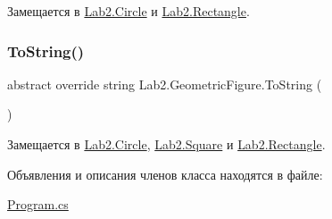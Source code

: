 Замещается в \hyperlink{class_lab2_1_1_circle_afe38ef7cc9ce4b02a6e640d3029e5962}{Lab2.\+Circle} и \hyperlink{class_lab2_1_1_rectangle_a3a44a2229aaec3be07a35eb6a167b100}{Lab2.\+Rectangle}.

\mbox{\label{class_lab2_1_1_geometric_figure_a2f466edc438f43540ead2bc66925ef0a}} 
\subsubsection{\texorpdfstring{To\+String()}{ToString()}}
{\footnotesize\ttfamily abstract override string Lab2.\+Geometric\+Figure.\+To\+String (\begin{DoxyParamCaption}{ }\end{DoxyParamCaption})\hspace{0.3cm}{\ttfamily [pure virtual]}}



Замещается в \hyperlink{class_lab2_1_1_circle_ab2ed9c25791cb878a8a8d8857786917d}{Lab2.\+Circle}, \hyperlink{class_lab2_1_1_square_ac43e17280bb521a3466a38ec0e4742eb}{Lab2.\+Square} и \hyperlink{class_lab2_1_1_rectangle_a6c03cbd28985951c1c167b51ed47cdd4}{Lab2.\+Rectangle}.



Объявления и описания членов класса находятся в файле\+:\begin{DoxyCompactItemize}
\item 
\hyperlink{_program_8cs}{Program.\+cs}\end{DoxyCompactItemize}
